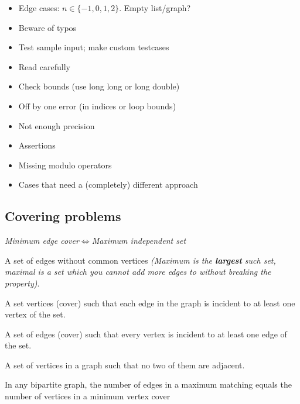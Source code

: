 \documentclass{article}
\begin{document}
\begin{itemize}
	\setlength\itemsep{-.25em}
	\item Edge cases: $n\in\{-1,0,1,2\}$. Empty list/graph?
	\item Beware of typos
	\item Test sample input; make custom testcases
	\item Read carefully
	\item Check bounds (use long long or long double)
	\item Off by one error (in indices or loop bounds)
	\item Not enough precision
	\item Assertions
	\item Missing modulo operators
	\item Cases that need a (completely) different approach
\end{itemize}

\subsection{Covering problems}

\begin{center}
	\emph{Minimum edge cover$\iff$Maximum independent set}
\end{center}

\begin{description}
	\setlength\itemsep{-.25em}
	\item[Matching]
		A set of edges without common vertices \textit{(Maximum is the \textbf{largest} such set, maximal is a set which you cannot add more edges to without breaking the property)}.
	\item[Minimum Vertex Cover]
		A set vertices (cover) such that each edge in the graph is incident to at least one vertex of the set.
	\item[Minimum Edge Cover]
		A set of edges (cover) such that every vertex is incident to at least one edge of the set.
	\item[Maximum Independent Set]
		A set of vertices in a graph such that no two of them are adjacent.
	\item[K\"{o}nig's theorem]
		In any bipartite graph, the number of edges in a maximum matching equals the number of vertices in a minimum vertex cover
\end{description}
\end{document}
